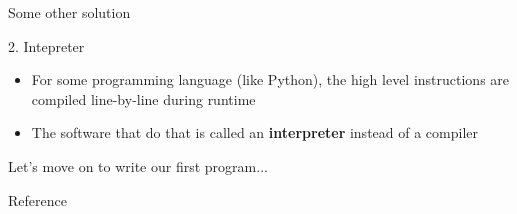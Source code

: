 \documentclass[10pt,xcolor={table,dvipsnames},t]{beamer}
\begin{document}
\begin{frame}{Some other solution}
  \begin{block}{2. Intepreter}
    \begin{itemize}
      \item For some programming language (like Python), the high level instructions are compiled line-by-line during runtime
      \item The software that do that is called an \textbf{interpreter} instead of a compiler
    \end{itemize}
  \end{block}
\end{frame}

\begin{frame}{Let's move on to write our first program...}
  
\end{frame}
\begin{frame}[allowframebreaks]{Reference}
  \printbibliography
\end{frame}
\end{document}
